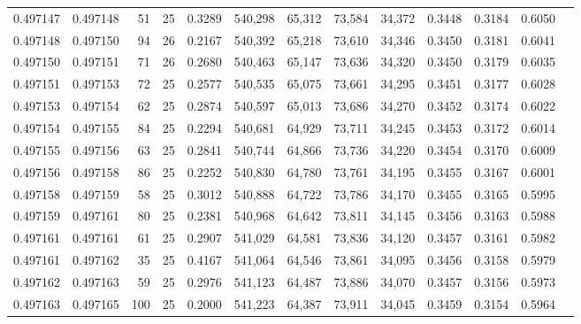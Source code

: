 \begin{tabular}{rrrrrrrrrrrrr}
0.497147 & 0.497148 &    51 &  25 &                                     0.3289 & 540,298 &  65,312 &  73,584 &  34,372 & 0.3448 & 0.3184 & 0.6050 \\
0.497148 & 0.497150 &    94 &  26 &                                     0.2167 & 540,392 &  65,218 &  73,610 &  34,346 & 0.3450 & 0.3181 & 0.6041 \\
0.497150 & 0.497151 &    71 &  26 &                                     0.2680 & 540,463 &  65,147 &  73,636 &  34,320 & 0.3450 & 0.3179 & 0.6035 \\
0.497151 & 0.497153 &    72 &  25 &                                     0.2577 & 540,535 &  65,075 &  73,661 &  34,295 & 0.3451 & 0.3177 & 0.6028 \\
0.497153 & 0.497154 &    62 &  25 &                                     0.2874 & 540,597 &  65,013 &  73,686 &  34,270 & 0.3452 & 0.3174 & 0.6022 \\
0.497154 & 0.497155 &    84 &  25 &                                     0.2294 & 540,681 &  64,929 &  73,711 &  34,245 & 0.3453 & 0.3172 & 0.6014 \\
0.497155 & 0.497156 &    63 &  25 &                                     0.2841 & 540,744 &  64,866 &  73,736 &  34,220 & 0.3454 & 0.3170 & 0.6009 \\
0.497156 & 0.497158 &    86 &  25 &                                     0.2252 & 540,830 &  64,780 &  73,761 &  34,195 & 0.3455 & 0.3167 & 0.6001 \\
0.497158 & 0.497159 &    58 &  25 &                                     0.3012 & 540,888 &  64,722 &  73,786 &  34,170 & 0.3455 & 0.3165 & 0.5995 \\
0.497159 & 0.497161 &    80 &  25 &                                     0.2381 & 540,968 &  64,642 &  73,811 &  34,145 & 0.3456 & 0.3163 & 0.5988 \\
0.497161 & 0.497161 &    61 &  25 &                                     0.2907 & 541,029 &  64,581 &  73,836 &  34,120 & 0.3457 & 0.3161 & 0.5982 \\
0.497161 & 0.497162 &    35 &  25 &                                     0.4167 & 541,064 &  64,546 &  73,861 &  34,095 & 0.3456 & 0.3158 & 0.5979 \\
0.497162 & 0.497163 &    59 &  25 &                                     0.2976 & 541,123 &  64,487 &  73,886 &  34,070 & 0.3457 & 0.3156 & 0.5973 \\
0.497163 & 0.497165 &   100 &  25 &                                     0.2000 & 541,223 &  64,387 &  73,911 &  34,045 & 0.3459 & 0.3154 & 0.5964 \\

\end{tabular}
